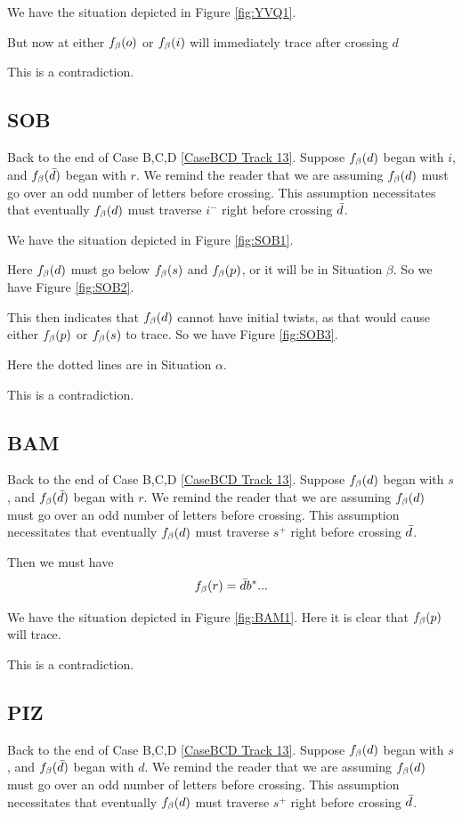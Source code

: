 We have the situation depicted in Figure \ref{fig:YVQ1}.

But now at either $f_\beta(o)$ or $f_\beta(i)$ will immediately trace after crossing $d$

This is a contradiction.

\subsection{SOB}\label{SOB}
Back to the end of Case B,C,D \ref{CaseBCD Track 13}.
Suppose $f_\beta(d)$ began with $i$, and $f_\beta(\bar{d})$ began with $r$. We remind the reader that we are assuming $f_\beta(d)$ must go over an odd number of letters before crossing. This assumption necessitates that eventually $f_\beta(d)$ must traverse $i^-$ right before crossing $\bar{d}$.

We have the situation depicted in Figure \ref{fig:SOB1}.

Here $f_\beta(d)$ must go below $f_\beta(s)$ and $f_\beta(p)$, or it will be in Situation $\beta$. So we have Figure \ref{fig:SOB2}.

This then indicates that $f_\beta(d)$ cannot have initial twists, as that would cause either $f_\beta(p)$ or $f_\beta(s)$ to trace. So we have Figure \ref{fig:SOB3}.

Here the dotted lines are in Situation $\alpha$.

This is a contradiction.

\subsection{BAM}\label{BAM}
Back to the end of Case B,C,D \ref{CaseBCD Track 13}.
Suppose $f_\beta(d)$ began with $s$, and $f_\beta(\bar{d})$ began with $r$. We remind the reader that we are assuming $f_\beta(d)$ must go over an odd number of letters before crossing. This assumption necessitates that eventually $f_\beta(d)$ must traverse $s^+$ right before crossing $\bar{d}$.

Then we must have
\[
f_\beta(r) = \bar{d} b^*...
\]

We have the situation depicted in Figure \ref{fig:BAM1}. Here it is clear that $f_\beta(p)$ will trace.

This is a contradiction.


\subsection{PIZ}\label{PIZ}
Back to the end of Case B,C,D \ref{CaseBCD Track 13}.
Suppose $f_\beta(d)$ began with $s$, and $f_\beta(\bar{d})$ began with $d$. We remind the reader that we are assuming $f_\beta(d)$ must go over an odd number of letters before crossing. This assumption necessitates that eventually $f_\beta(d)$ must traverse $s^+$ right before crossing $\bar{d}$.


